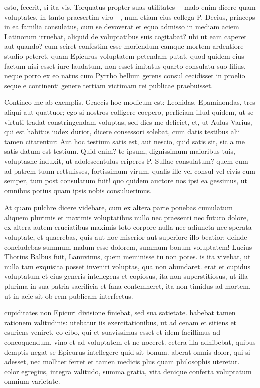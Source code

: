  esto, fecerit, si ita vis, Torquatus propter suas utilitates— malo enim dicere quam voluptates, in tanto praesertim viro—, num etiam eius collega P. Decius, princeps in ea familia consulatus, cum se devoverat et equo admisso in mediam aciem Latinorum irruebat, aliquid de voluptatibus suis cogitabat? ubi ut eam caperet aut quando? cum sciret confestim esse moriendum eamque mortem ardentiore studio peteret, quam Epicurus voluptatem petendam putat. quod quidem eius factum nisi esset iure laudatum, non esset imitatus quarto consulatu suo filius, neque porro ex eo natus cum Pyrrho bellum gerens consul cecidisset in proelio seque e continenti genere tertiam victimam rei publicae praebuisset.

 Contineo me ab exemplis. Graecis hoc modicum est: Leonidas, Epaminondas, tres aliqui aut quattuor; ego si nostros colligere coepero, perficiam illud quidem, ut se virtuti tradat constringendam voluptas, sed dies me deficiet, et, ut Aulus Varius, qui est habitus iudex durior, dicere consessori solebat, cum datis testibus alii tamen citarentur: Aut hoc testium satis est, aut nescio, quid satis sit, sic a me satis datum est testium. Quid enim? te ipsum, dignissimum maioribus tuis, voluptasne induxit, ut adolescentulus eriperes P. Sullae consulatum? quem cum ad patrem tuum rettulisses, fortissimum virum, qualis ille vel consul vel civis cum semper, tum post consulatum fuit! quo quidem auctore nos ipsi ea gessimus, ut omnibus potius quam ipsis nobis consuluerimus.

 At quam pulchre dicere videbare, cum ex altera parte ponebas cumulatum aliquem plurimis et maximis voluptatibus nullo nec praesenti nec futuro dolore, ex altera autem cruciatibus maximis toto corpore nulla nec adiuncta nec sperata voluptate, et quaerebas, quis aut hoc miserior aut superiore illo beatior; deinde concludebas summum malum esse dolorem, summum bonum voluptatem! Lucius Thorius Balbus fuit, Lanuvinus, quem meminisse tu non potes. is ita vivebat, ut nulla tam exquisita posset inveniri voluptas, qua non abundaret. erat et cupidus voluptatum et eius generis intellegens et copiosus, ita non superstitiosus, ut illa plurima in sua patria sacrificia et fana contemneret, ita non timidus ad mortem, ut in acie sit ob rem publicam interfectus.

 cupiditates non Epicuri divisione finiebat, sed sua satietate. habebat tamen rationem valitudinis: utebatur iis exercitationibus, ut ad cenam et sitiens et esuriens veniret, eo cibo, qui et suavissimus esset et idem facillimus ad concoquendum, vino et ad voluptatem et ne noceret. cetera illa adhibebat, quibus demptis negat se Epicurus intellegere quid sit bonum. aberat omnis dolor, qui si adesset, nec molliter ferret et tamen medicis plus quam philosophis uteretur. color egregius, integra valitudo, summa gratia, vita denique conferta voluptatum omnium varietate.

